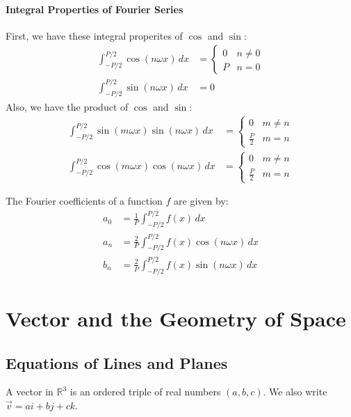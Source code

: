 \documentclass[11pt]{article}
\begin{document}
\paragraph{Integral Properties of Fourier Series} First, we have these integral properites of $\cos$ and $\sin$:
\begin{align}
    \int_{-P/2}^{P/2} \cos(n\omega x) \, dx &= \begin{cases}
        0 & n \ne 0 \\
        P & n = 0
    \end{cases} \\
    \int_{-P/2}^{P/2} \sin(n\omega x) \, dx &= 0
\end{align}
Also, we have the product of $\cos$ and $\sin$:
\begin{align}
    \int_{-P/2}^{P/2} \sin(m\omega x) \sin(n\omega x) \, dx &= \begin{cases}
        0 & m \ne n \\
        \frac{P}{2} & m = n
    \end{cases} \\ 
    \int_{-P/2}^{P/2} \cos(m\omega x) \cos(n\omega x) \, dx &= \begin{cases}
        0 & m \ne n \\
        \frac{P}{2} & m = n
    \end{cases} 
\end{align}
\begin{theorem}
    The Fourier coefficients of a function $f$ are given by:
    \begin{align}
        a_0 &= \frac{1}{P} \int_{-P/2}^{P/2} f(x) \, dx \\
        a_n &= \frac{2}{P} \int_{-P/2}^{P/2} f(x) \cos(n\omega x) \, dx \\
        b_n &= \frac{2}{P} \int_{-P/2}^{P/2} f(x) \sin(n\omega x) \, dx
    \end{align}
\end{theorem}
\section{Vector and the Geometry of Space}
\subsection{Equations of Lines and Planes}
\begin{definition}
    A vector in $\mathbb{R}^3$ is an ordered triple of real numbers $(a, b, c)$. We also write $\vec{v} = ai + bj + ck$.
\end{definition}
\end{document}
